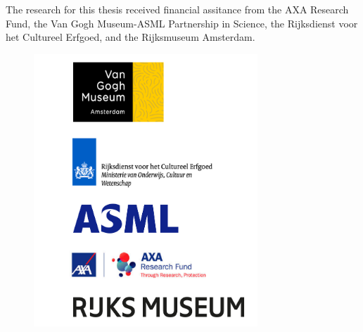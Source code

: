 The research for this thesis received financial assitance from the AXA Research Fund, the Van Gogh Museum-ASML Partnership in Science, the Rijksdienst voor het Cultureel Erfgoed, and the Rijksmuseum Amsterdam. 

\vspace{1.5cm}

\begin{figure}[!h]
\centering
\includegraphics[width=0.75\textwidth]{Logo_institutions.png}
\label{fig:colours_description}
\end{figure}

\newpage
